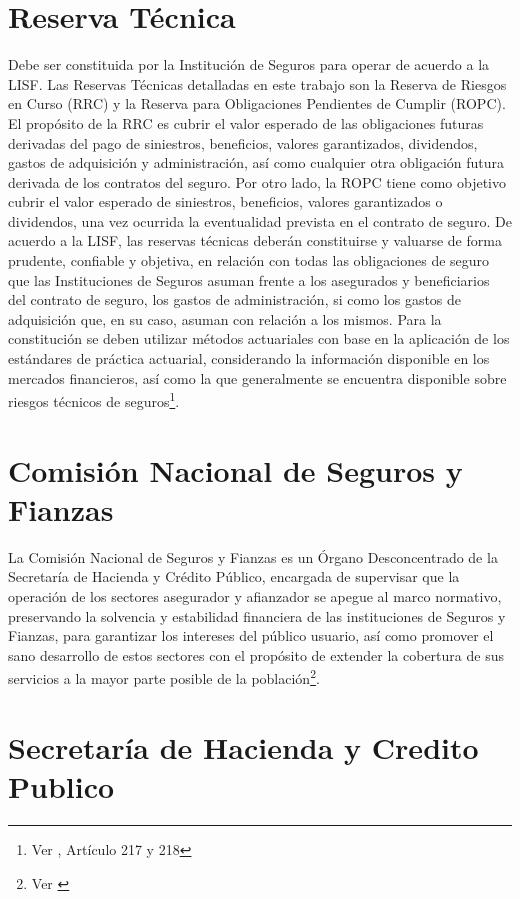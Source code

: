 \documentclass[11pt,twoside,openright,spanish]{report}
\numberwithin{equation}{chapter}
\numberwithin{figure}{chapter}
\numberwithin{table}{chapter}
\begin{document}
	\section{Reserva Técnica}

	Debe ser constituida por la Institución de Seguros para operar de acuerdo a la LISF. Las Reservas Técnicas detalladas en este trabajo son la Reserva de Riesgos en Curso (RRC) y la Reserva para Obligaciones Pendientes de Cumplir (ROPC). El propósito de la RRC es cubrir el valor esperado de las obligaciones futuras derivadas del pago de siniestros, beneficios, valores garantizados, dividendos, gastos de adquisición y administración, así como cualquier otra obligación futura derivada de los contratos del seguro. Por otro lado, la ROPC tiene como objetivo cubrir el valor esperado de siniestros, beneficios, valores garantizados o dividendos, una vez ocurrida la eventualidad prevista en el contrato de seguro. De acuerdo a la LISF, las reservas técnicas deberán constituirse y valuarse de forma prudente, confiable y objetiva, en relación con todas las obligaciones de seguro que las Instituciones de Seguros asuman frente a los asegurados y beneficiarios del contrato de seguro, los gastos de administración, si como los gastos de adquisición que, en su caso, asuman con relación a los mismos. Para la constitución se deben utilizar métodos actuariales con base en la aplicación de los estándares de práctica actuarial, considerando la información disponible en los mercados financieros, así como la que generalmente se encuentra disponible sobre riesgos técnicos de seguros\footnote{Ver \citet{DReservasTec}, Artículo 217 y 218}. 
	
	\section{Comisión Nacional de Seguros y Fianzas}

	La Comisión Nacional de Seguros y Fianzas es un Órgano Desconcentrado de la Secretaría de Hacienda y Crédito Público, encargada de supervisar que la operación de los sectores asegurador y afianzador se apegue al marco normativo, preservando la solvencia y estabilidad financiera de las instituciones de Seguros y Fianzas, para garantizar los intereses del público usuario, así como promover el sano desarrollo de estos sectores con el propósito de extender la cobertura de sus servicios a la mayor parte posible de la población\footnote{Ver \citet{EComision}}. 
	
	\section{Secretaría de Hacienda y Credito Publico}
	
\end{document}
